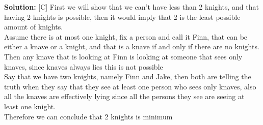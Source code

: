 \documentclass[12pt]{article}
\newenvironment{solution}{%
    \vspace{1em}
    \noindent\textbf{Solution:} 
}{}
\newcommand{\myVertex}[3]{%
    \Vertex[x=#1,y=#2,size=0.5,label=$#3$,position=90,fontscale=2,style={color=blue}]{#3}
}
\newcommand{\simpleVertex}[3]{%
    \Vertex[x=#1,y=#2,size=0.5,position=180,fontscale=2,style={color=red}]{#3}
}
\begin{document}
\begin{solution}[C]
   First we will show that we can't have less than 2 knights, and that having 2 knights is possible, then it would imply that 2 is the least possible amount of knights.\\
   Assume there is at most one knight, fix a person and call it Finn, that can be either a knave or a knight, and that is a knave if and only if there are no knights. Then any knave that is looking at Finn is looking at someone that sees only knaves, since knaves always lies this is not possible \\
   Say that we have two knights, namely Finn and Jake, then both are telling the truth when they say that they see at least one person who sees only knaves, also all the knaves are effectively lying since all the persons they see are seeing at least one knight.\\
   Therefore we can conclude that 2 knights is minimum


\begin{center}
\end{center}
\end{solution}
\vskip 1cm 
\end{document}
